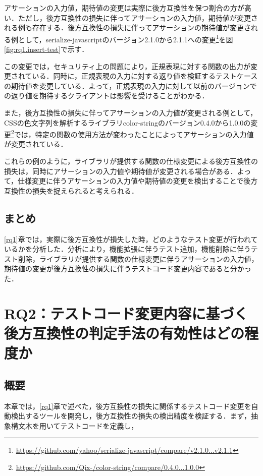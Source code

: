 \documentclass[11pt,dvipdfmx]{jreport}
\begin{document}
アサーションの入力値，期待値の変更は実際に後方互換性を保つ割合の方が高い．ただし，後方互換性の損失に伴ってアサーションの入力値，期待値が変更される例も存在する．後方互換性の損失に伴ってアサーションの期待値が変更される例として，serialize-javascriptのバージョン2.1.0から2.1.1への変更\footnote{\url{https://github.com/yahoo/serialize-javascript/compare/v2.1.0...v2.1.1}}を図\ref{fig:rq1.insert-test}で示す．

この変更では，セキュリティ上の問題により，正規表現に対する関数の出力が変更されている．同時に，正規表現の入力に対する返り値を検証するテストケースの期待値を変更している．よって，正規表現の入力に対して以前のバージョンでの返り値を期待するクライアントは影響を受けることがわかる．

また，後方互換性の損失に伴ってアサーションの入力値が変更される例として，CSSの色文字列を解析するライブラリcolor-stringのバージョン0.4.0から1.0.0の変更\footnote{\url{https://github.com/Qix-/color-string/compare/0.4.0...1.0.0}}では，特定の関数の使用方法が変わったことによってアサーションの入力値が変更されている．

これらの例のように，ライブラリが提供する関数の仕様変更による後方互換性の損失は，同時にアサーションの入力値や期待値が変更される場合がある．よって，仕様変更に伴うアサーションの入力値や期待値の変更を検出することで後方互換性の損失を捉えられると考えられる．

\section{まとめ}
\ref{rq1}章では，実際に後方互換性が損失した時，どのようなテスト変更が行われているかを分析した．分析により，機能拡張に伴うテスト追加，機能削除に伴うテスト削除，ライブラリが提供する関数の仕様変更に伴うアサーションの入力値，期待値の変更が後方互換性の損失に伴うテストコード変更内容であると分かった．

\chapter{RQ2：テストコード変更内容に基づく後方互換性の判定手法の有効性はどの程度か}

\section{概要}
本章では，\ref{rq1}章で述べた，後方互換性の損失に関係するテストコード変更を自動検出するツールを開発し，後方互換性の損失の検出精度を検証する．まず，抽象構文木を用いてテストコードを定義し，
\end{document}
